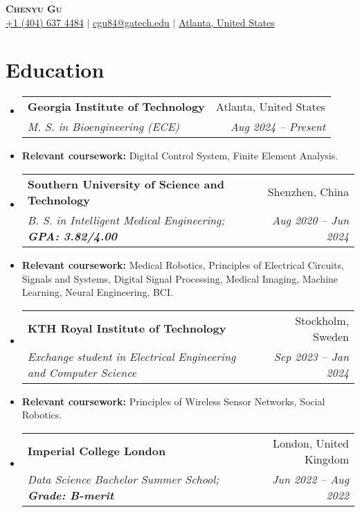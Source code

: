 \documentclass[letterpaper,11pt]{article}
\makeatletter
\newcommand{\resumeItem}[1]{
  \item\small{
    {#1 \vspace{-2pt}}
  }
}
\newcommand{\resumeSubheading}[4]{
  \vspace{-2pt}\item
  \begin{tabular*}{0.97\textwidth}[t]{l@{\extracolsep{\fill}}r}
    \textbf{#1} & #2 \\
    \textit{\small#3} & \textit{\small #4} \\
  \end{tabular*}\vspace{-7pt}
}
\newcommand{\resumeSubHeadingListStart}{\begin{itemize}[leftmargin=0.15in, label={}]}
\newcommand{\resumeSubHeadingListEnd}{\end{itemize}}
\makeatother
\begin{document}
\begin{center}
  \textbf{\Huge \scshape Chenyu Gu} \\ \vspace{3pt}
  \small
  \faMobile \hspace{.5pt} \href{tel:14046374484}{+1 (404) 637 4484}
  $|$
  \faAt \hspace{.5pt} \href{mailto:cgu84@gatech.edu}{cgu84@gatech.edu}
  $|$
  \faMapMarker \hspace{.5pt} \href{https://www.google.com/maps/place/Georgia+Institute+of+Technology/@33.7756222,-84.3988599,16z/data=!3m1!4b1}{Atlanta, United States}
\end{center}

\section{Education}
\vspace{3pt}
\resumeSubHeadingListStart

\resumeSubheading
{Georgia Institute of Technology}{Atlanta, United States}
{M.
  S.
  in Bioengineering (ECE)}{Aug 2024 -- Present}
\resumeItem{\small \textbf{Relevant coursework:}
  Digital Control System, Finite Element Analysis.
}

\resumeSubheading
{Southern University of Science and Technology}{Shenzhen, China}
{B.
  S.
  in Intelligent Medical Engineering; \textbf{GPA: 3.82/4.00}}{Aug 2020 -- Jun 2024}
\resumeItem{\small \textbf{Relevant coursework:}
  Medical Robotics, Principles of Electrical Circuits, Signals and Systems, Digital Signal
  Processing, Medical Imaging, Machine Learning, Neural Engineering, BCI.
}

\resumeSubheading
{KTH Royal Institute of Technology}{Stockholm, Sweden}
{Exchange student in Electrical Engineering and Computer Science}{Sep 2023 -- Jan 2024}
\resumeItem{\small \textbf{Relevant coursework:}
  Principles of Wireless Sensor Networks, Social Robotics.
}

\resumeSubheading
{Imperial College London}{London, United Kingdom}
{Data Science Bachelor Summer School; \textbf{Grade: B-merit}}{Jun 2022 -- Aug 2022}

\resumeSubHeadingListEnd

\end{document}
